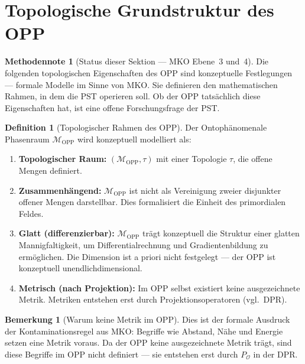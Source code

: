 \documentclass[11pt,a4paper]{article}
\theoremstyle{plain}
\theoremstyle{definition}
\newtheorem{definition}{Definition}[section]
\newtheorem{remark}{Bemerkung}[section]
\newtheorem{methodennote}{Methodennote}[section]
\begin{document}
\section{Topologische Grundstruktur des OPP}

\begin{methodennote}[Status dieser Sektion --- MKO Ebene~3 und~4]
Die folgenden topologischen Eigenschaften des OPP sind konzeptuelle Festlegungen ---
formale Modelle im Sinne von MKO. Sie definieren den mathematischen Rahmen, in dem
die PST operieren soll. Ob der OPP tats\"{a}chlich diese Eigenschaften hat, ist eine
offene Forschungsfrage der PST.
\end{methodennote}

\begin{definition}[Topologischer Rahmen des OPP]
Der Ontoph\"{a}nomenale Phasenraum $\mathcal{M}_{\text{OPP}}$ wird konzeptuell
modelliert als:
\begin{enumerate}
  \item \textbf{Topologischer Raum:} $(\mathcal{M}_{\text{OPP}}, \tau)$ mit einer
        Topologie $\tau$, die offene Mengen definiert.
  \item \textbf{Zusammenh\"{a}ngend:} $\mathcal{M}_{\text{OPP}}$ ist nicht als Vereinigung
        zweier disjunkter offener Mengen darstellbar. Dies formalisiert die Einheit des
        primordialen Feldes.
  \item \textbf{Glatt (differenzierbar):} $\mathcal{M}_{\text{OPP}}$ tr\"{a}gt
        konzeptuell die Struktur einer glatten Mannigfaltigkeit, um Differentialrechnung
        und Gradientenbildung zu erm\"{o}glichen. Die Dimension ist a priori nicht
        festgelegt --- der OPP ist konzeptuell unendlichdimensional.
  \item \textbf{Metrisch (nach Projektion):} Im OPP selbst existiert keine ausgezeichnete
        Metrik. Metriken entstehen erst durch Projektionsoperatoren (vgl.\ DPR).
\end{enumerate}
\end{definition}

\begin{remark}[Warum keine Metrik im OPP]
Dies ist der formale Ausdruck der Kontaminationsregel aus MKO: Begriffe wie Abstand,
N\"{a}he und Energie setzen eine Metrik voraus. Da der OPP keine ausgezeichnete
Metrik tr\"{a}gt, sind diese Begriffe im OPP nicht definiert --- sie entstehen erst
durch $P_{\mathcal{O}}$ in der DPR.
\end{remark}
\end{document}
